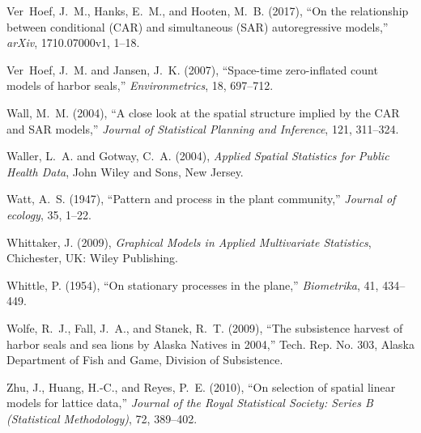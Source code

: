 \documentclass[11pt, titlepage]{article}\usepackage[]{graphicx}\usepackage[]{color}
\begin{document}
\begin{spacing}{1.9}
\begin{flushleft}
\begin{thebibliography}{126}
Ver~Hoef, J.~M., Hanks, E.~M., and Hooten, M.~B. (2017), \enquote{On the
  relationship between conditional (CAR) and simultaneous (SAR) autoregressive
  models,} \textit{arXiv}, 1710.07000v1, 1--18.

Ver~Hoef, J.~M. and Jansen, J.~K. (2007), \enquote{Space-time zero-inflated
  count models of harbor seals,} \textit{Environmetrics}, 18, 697--712.

Wall, M.~M. (2004), \enquote{A close look at the spatial structure implied by
  the {CAR} and {SAR} models,} \textit{Journal of Statistical Planning and
  Inference}, 121, 311--324.

Waller, L.~A. and Gotway, C.~A. (2004), \textit{Applied Spatial Statistics for
  Public Health Data}, John Wiley and Sons, New Jersey.

Watt, A.~S. (1947), \enquote{Pattern and process in the plant community,}
  \textit{Journal of ecology}, 35, 1--22.

Whittaker, J. (2009), \textit{Graphical Models in Applied Multivariate
  Statistics}, Chichester, UK: Wiley Publishing.

Whittle, P. (1954), \enquote{On stationary processes in the plane,}
  \textit{Biometrika}, 41, 434--449.

Wolfe, R.~J., Fall, J.~A., and Stanek, R.~T. (2009), \enquote{The subsistence
  harvest of harbor seals and sea lions by Alaska Natives in 2004,} Tech. Rep.
  No. 303, Alaska Department of Fish and Game, Division of Subsistence.

Zhu, J., Huang, H.-C., and Reyes, P.~E. (2010), \enquote{On selection of
  spatial linear models for lattice data,} \textit{Journal of the Royal
  Statistical Society: Series B (Statistical Methodology)}, 72, 389--402.

\end{thebibliography}


\end{flushleft}
\end{spacing}
\end{document}
